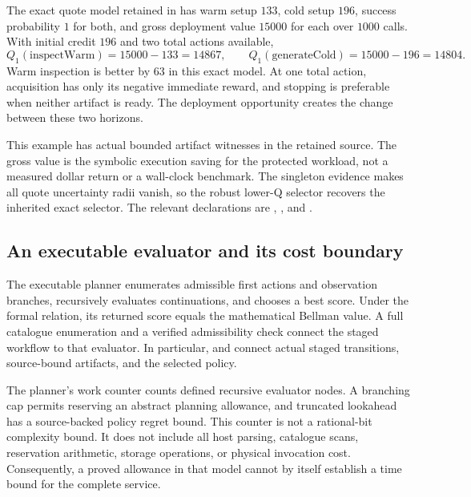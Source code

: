 \begin{example}
The exact quote model retained in  has
warm setup $133$, cold setup $196$, success probability $1$ for both, and gross
deployment value $15000$ for each over $1000$ calls. With initial credit $196$
and two total actions available,
\[
 Q_1(\mathrm{inspectWarm})=15000-133=14867,
 \qquad
 Q_1(\mathrm{generateCold})=15000-196=14804.
\]
Warm inspection is better by $63$ in this exact model. At one total action,
acquisition has only its negative immediate reward, and stopping is preferable
when neither artifact is ready. The deployment opportunity creates the change
between these two horizons.
\end{example}

This example has actual bounded artifact witnesses in the retained source.
The gross value is the symbolic execution saving for the protected workload,
not a measured dollar return or a wall-clock benchmark. The singleton evidence
makes all quote uncertainty radii vanish, so the robust lower-Q selector
recovers the inherited exact selector. The relevant declarations are
,
, and
.

\subsection{An executable evaluator and its cost boundary}

The executable planner enumerates admissible first actions and observation
branches, recursively evaluates continuations, and chooses a best score. Under
the formal  relation, its returned score equals the mathematical
Bellman value. A full catalogue enumeration and a verified admissibility check
connect the staged workflow to that evaluator. In particular,
 and
 connect actual staged transitions,
source-bound artifacts, and the selected policy.

The planner's work counter counts defined recursive evaluator nodes. A branching
cap permits reserving an abstract planning allowance, and truncated lookahead
has a source-backed policy regret bound. This counter is not a rational-bit
complexity bound. It does not include all host parsing, catalogue scans,
reservation arithmetic, storage operations, or physical invocation cost.
Consequently, a proved allowance in that model cannot by itself establish a
time bound for the complete service.

